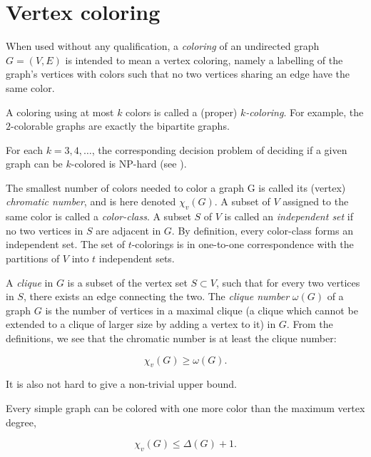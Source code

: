 \section{Vertex coloring}

When used without any qualification, a {\it coloring} of an
undirected graph $G=(V,E)$ is intended 
to mean a vertex coloring, namely a labelling of the graph's
vertices with colors such that no two vertices sharing an
edge have the same color.

A coloring using at most $k$ colors is called a (proper) {\it $k$-coloring}. 
For example, the $2$-colorable graphs are exactly the bipartite graphs.

\begin{remark}
For each $k=3,4,\dots$, the corresponding decision problem of deciding
if a given graph can be $k$-colored is NP-hard
(see \cite{JaegerEtAl1990}).
\end{remark}

The smallest number of colors needed to color a graph G is called 
its (vertex) {\it chromatic number}, and is here denoted $\chi_v(G)$. 
A subset of $V$ assigned to the same color is called a {\it color-class}.
A subset $S$ of $V$ is called an {\it independent set} if no two vertices
in $S$ are adjacent in $G$. By definition, every color-class forms 
an independent set. The set of $t$-colorings is in one-to-one
correspondence with the partitions of $V$ into $t$ independent sets.

A {\it clique} in $G$ is a subset of the vertex set $S \subset V$, such that
for every two vertices in $S$, there exists an edge connecting the two.
The {\it clique number} $\omega (G)$ of a graph $G$ is the number of vertices 
in a maximal clique (a clique which cannot be extended to a clique of 
larger size
by adding a vertex to it) in $G$.
From the definitions, we see that
the chromatic number is at least the clique number:

\[
    \chi_v(G) \ge \omega(G).
\]

It is also not hard to give a non-trivial upper bound.

\begin{theorem} 
Every simple graph can be colored with one more color than the 
maximum vertex degree,

\[
    \chi_v(G) \le \Delta(G) + 1. 
\]
\end{theorem}

